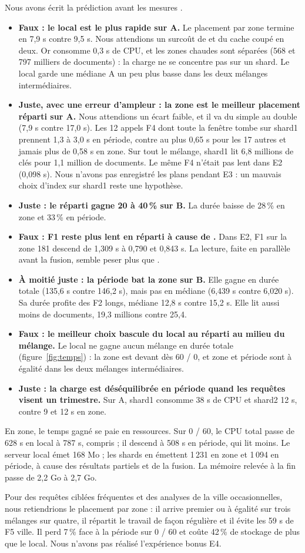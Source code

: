 Nous avons écrit la prédiction avant les mesures \cite{prediction}.
\begin{itemize}
\item \textbf{Faux : le local est le plus rapide sur A.} Le placement par zone termine en
7,9 s contre 9,5 s. Nous attendions un surcoût de  et du cache coupé en deux.
Or  consomme 0,3 s de CPU, et les zones chaudes sont séparées (568 et 797
milliers de documents) : la charge ne se concentre pas sur un shard. Le local garde une
médiane A un peu plus basse dans les deux mélanges intermédiaires.
\item \textbf{Juste, avec une erreur d'ampleur : la zone est le meilleur placement réparti
sur A.} Nous attendions un écart faible, et il va du simple au double (7,9 s contre 17,0 s).
Les 12 appels F4 dont toute la fenêtre tombe sur shard1 prennent 1,3 à 3,0 s en période, contre
au plus 0,65 s pour les 17 autres et jamais plus de 0,58 s en zone. Sur tout le mélange, shard1 lit 6,8 millions
de clés pour 1,1 million de documents. Le même F4 n'était pas lent dans E2 (0,098 s). Nous n'avons pas enregistré les plans pendant E3 : un mauvais choix d'index sur shard1 reste une hypothèse.
\item \textbf{Juste : le réparti gagne 20 à 40\,\% sur B.} La durée baisse de 28\,\% en zone et
33\,\% en période.
\item \textbf{Faux : F1 reste plus lent en réparti à cause de .} Dans E2, F1 sur la
zone 181 descend de 1,309 s à 0,790 et 0,843 s. La lecture, faite en parallèle avant la fusion,
semble peser plus que .
\item \textbf{À moitié juste : la période bat la zone sur B.} Elle gagne en durée totale (135,6 s
contre 146,2 s), mais pas en médiane (6,439 s contre 6,020 s). Sa durée profite des F2 longs,
médiane 12,8 s contre 15,2 s. Elle lit aussi moins de documents, 19,3 millions contre 25,4.
\item \textbf{Faux : le meilleur choix bascule du local au réparti au milieu du mélange.} Le
local ne gagne aucun mélange en durée totale (figure~\ref{fig:temps}) : la zone est devant dès 60 / 0, et zone et période
sont à égalité dans les deux mélanges intermédiaires.
\item \textbf{Juste : la charge est déséquilibrée en période quand les requêtes visent un
trimestre.} Sur A, shard1 consomme 38 s de CPU et shard2 12 s, contre 9 et 12 s en zone.
\end{itemize}

En zone, le temps gagné se paie en ressources. Sur 0 / 60, le CPU total passe de 628 s en local à
787 s,  compris ; il descend à 508 s en période, qui lit moins. Le serveur local
émet 168 Mo ; les shards en émettent 1\,231 en zone et 1\,094 en période, à cause des
résultats partiels et de la fusion. La mémoire relevée à la fin passe de 2,2 Go à 2,7 Go.

Pour des requêtes ciblées fréquentes et des analyses de la ville occasionnelles, nous
retiendrions le placement par zone : il arrive premier ou à égalité sur trois mélanges sur quatre,
il répartit le travail de façon régulière et il évite les 59 s de F5 ville. Il perd 7\,\% face
à la période sur 0 / 60 et coûte 42\,\% de stockage de plus que le local. Nous n'avons pas réalisé l'expérience bonus E4.
